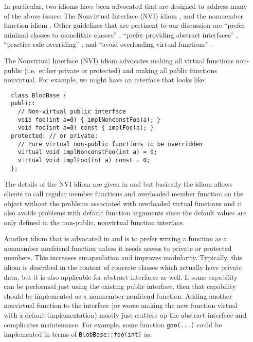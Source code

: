 \documentclass[pdf,ps2pdf,11pt]{SANDreport}
\begin{document}
\begin{itemize}
\end{itemize}

In particular, two idioms have been advocated that are designed to address many
of the above issues: The Nonvirtual Interface (NVI) idiom {}\cite[Item
39]{C++CodingStandards05}, and the nonmember function idiom {}\cite[Item
44]{C++CodingStandards05}.  Other guidelines that are pertinent to our
discussion are ``prefer minimal classes to monolithic classes'' {}\cite[Item
33]{C++CodingStandards05}, ``prefer providing abstract interfaces''
{}\cite[Item 36]{C++CodingStandards05}, ``practice safe overriding''
{}\cite[Item 38]{C++CodingStandards05} {}\cite[Gotcha 74]{C++Gotchas03}, and
``avoid overloading virtual functions'' {}\cite[Gotcha 73]{C++Gotchas03}.

The Nonvirtual Interface (NVI) idiom {}\cite[Item 35]{EffectiveC++3rd}
advocates making all virtual functions non-public (i.e.\ either private or
protected) and making all public functions nonvirtual.  For example, we might
have an interface that looks like:

{\small\begin{verbatim}
  class BlobBase {
  public:
    // Non-virtual public interface
    void foo(int a=0) { implNonconstFoo(a); }
    void foo(int a=0) const { implFoo(a); }
  protected: // or private:
    // Pure virtual non-public functions to be overridden
    virtual void implNonconstFoo(int a) = 0;
    virtual void implFoo(int a) const = 0;
  };
\end{verbatim}}

The details of the NVI idiom are given in {}\cite[Item
39]{C++CodingStandards05} and {}\cite[Item 35]{EffectiveC++3rd} but basically
the idiom allows clients to call regular member functions and overloaded
member function on the object without the problems associated with overloaded
virtual functions and it also avoids problems with default function arguments
since the default values are only defined in the non-public, nonvirtual
function interface.

Another idiom that is advocated in {}\cite[Item 44]{C++CodingStandards05} and
{}\cite[Item 23]{EffectiveC++3rd} is to prefer writing a function as a
nonmember nonfriend function unless it needs access to private or protected
members.  This increases encapsulation and improves modularity.  Typically,
this idiom is described in the context of concrete classes which actually have
private data, but it is also applicable for abstract interfaces as well.  If
some capability can be performed just using the existing public interface,
then that capability should be implemented as a nonmember nonfriend function.
Adding another nonvirtual function to the interface (or worse making the new
function virtual with a default implementation) mostly just clutters up the
abstract interface and complicates maintenance.  For example, some function
{}\texttt{goo(...)} could be implemented in terms of
{}\texttt{BlobBase\-::foo(int)} as:
\end{document}
